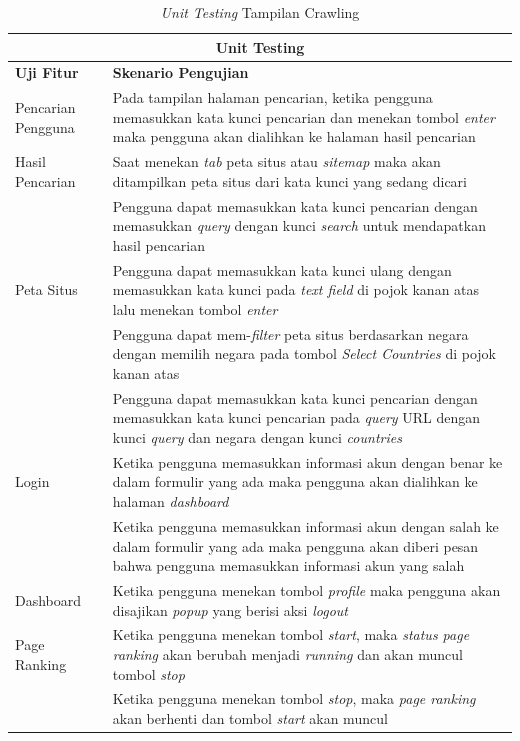 \begin{enumerate}[leftmargin=1\parindent]
	\begin{longtable}{@{}|p{4cm}|p{8cm}|@{}}
		\caption{\textit{Unit Testing} Tampilan Crawling}\\
		\hline
		\multicolumn{2}{|c|}{\textbf{Unit Testing}} \\
		\hline
		\textbf{Uji Fitur} & \textbf{Skenario Pengujian} \\
		\hline
		Pencarian Pengguna & Pada tampilan halaman pencarian, ketika pengguna memasukkan kata kunci pencarian dan menekan tombol \textit{enter} maka pengguna akan dialihkan ke halaman hasil pencarian \\
		\hline
		Hasil Pencarian & Saat menekan \textit{tab} peta situs atau \textit{sitemap} maka akan ditampilkan peta situs dari kata kunci yang sedang dicari \\
		\cline{2-2} 
		& Pengguna dapat memasukkan kata kunci pencarian dengan memasukkan \textit{query} dengan kunci \textit{search} untuk mendapatkan hasil pencarian \\
		\hline
		Peta Situs & Pengguna dapat memasukkan kata kunci ulang dengan memasukkan kata kunci pada \textit{text field} di pojok kanan atas lalu menekan tombol \textit{enter} \\
		\cline{2-2}
		& Pengguna dapat mem-\textit{filter} peta situs berdasarkan negara dengan memilih negara pada tombol \textit{Select Countries} di pojok kanan atas \\
		\cline{2-2}
		& Pengguna dapat memasukkan kata kunci pencarian dengan memasukkan kata kunci pencarian pada \textit{query} URL dengan kunci \textit{query} dan negara dengan kunci \textit{countries} \\
		\hline
		Login & Ketika pengguna memasukkan informasi akun dengan benar ke dalam formulir yang ada maka pengguna akan dialihkan ke halaman \textit{dashboard} \\
		\cline{2-2}
		& Ketika pengguna memasukkan informasi akun dengan salah ke dalam formulir yang ada maka pengguna akan diberi pesan bahwa pengguna memasukkan informasi akun yang salah \\	
		\hline
		Dashboard & Ketika pengguna menekan tombol \textit{profile} maka pengguna akan disajikan \textit{popup} yang berisi aksi \textit{logout}\\
		\hline
		Page Ranking & Ketika pengguna menekan tombol \textit{start}, maka \textit{status page ranking} akan berubah menjadi \textit{running} dan akan muncul tombol \textit{stop} \\
		\cline{2-2}	
		& Ketika pengguna menekan tombol \textit{stop}, maka \textit{page ranking} akan berhenti dan tombol \textit{start} akan muncul \\

\end{longtable}
\end{enumerate}
